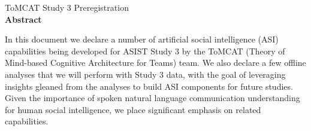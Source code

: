 \documentclass[oneside,9pt]{memoir}
\begin{document}
\thispagestyle{empty}
\begin{center}
    {\LARGE ToMCAT Study 3 Preregistration}\\
    \bigskip
    \textbf{Abstract}
\end{center}

    In this document we declare a number of artificial social intelligence
    (ASI) capabilities being developed for ASIST Study 3 by the ToMCAT (Theory
    of Mind-based Cognitive Architecture for Teams) team. We also declare a few
    offline analyses that we will perform with Study 3 data, with the goal of
    leveraging insights gleaned from the analyses to build ASI components for
    future studies. Given the importance of spoken natural language
    communication understanding for human social intelligence, we place
    significant emphasis on related capabilities.
\end{document}
